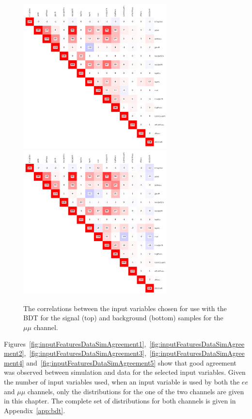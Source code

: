 \begin{figure}[htbp]
\centering
\includegraphics[width=0.7\textwidth]{figs/background-estimation/plots/corr_sig_mumu.pdf}
\\
\includegraphics[width=0.7\textwidth]{figs/background-estimation/plots/corr_bkg_mumu.pdf}
\caption{
The correlations between the input variables chosen for use with the BDT for the signal (top) and background (bottom) samples for the $\mu\mu$ channel.}
\label{fig:corr_mumu}
\end{figure}

Figures~\ref{fig:inputFeaturesDataSimAgreement1},~\ref{fig:inputFeaturesDataSimAgreement2},~\ref{fig:inputFeaturesDataSimAgreement3},~\ref{fig:inputFeaturesDataSimAgreement4} and~\ref{fig:inputFeaturesDataSimAgreement5} show that good agreement was observed between simulation and data for the selected input variables.
Given the number of input variables used, when an input variable is used by both the $ee$ and $\mu\mu$ channels, only the distributions for the one of the two channels are given in this chapter.
The complete set of distributions for both channels is given in Appendix~\ref{app:bdt}.

